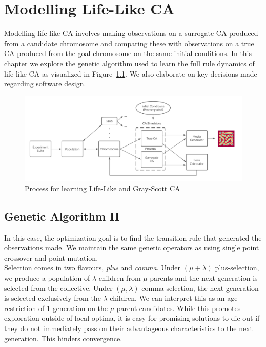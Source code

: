 \chapter{Modelling Life-Like CA} \label{lifelike}

Modelling life-like CA involves making observations on a surrogate CA produced from a candidate chromosome and comparing these with observations on a true CA produced from the goal chromosome on the same initial conditions. In this chapter we explore the genetic algorithm used to learn the full rule dynamics of life-like CA as visualized in Figure~\ref{fig:dataflow}. We also elaborate on key decisions made regarding software design. 

\begin{figure}[!h]
\centering
    \includegraphics[width=\textwidth]{images/dataflow.png}
    \caption{Process for learning Life-Like and Gray-Scott CA}
\label{fig:dataflow}
\end{figure}

\section{Genetic Algorithm II} \label{sec:ga-2}

In this case, the optimization goal is to find the transition rule that generated the observations made. We maintain the same genetic operators as  using single point crossover and point mutation.\\

Selection comes in two flavours, \textit{plus} and \textit{comma}. Under  $(\mu + \lambda)$ plus-selection, we produce a population of $\lambda$ children from $\mu$ parents and the next generation is selected from the collective. Under $(\mu, \lambda)$ comma-selection, the next generation is selected exclusively from the $\lambda$ children. We can interpret this as an age restriction of 1 generation on the $\mu$ parent candidates. While this promotes exploration outside of local optima, it is easy for promising solutions to die out if they do not immediately pass on their advantageous characteristics to the next generation. This hinders convergence.\\

